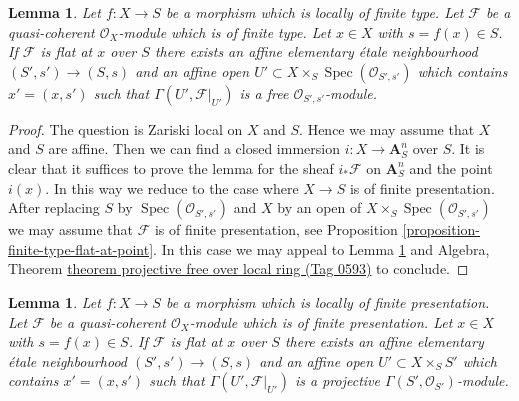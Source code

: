 \documentclass{amsart}
\theoremstyle{plain}
\newtheorem{lemma}[subsection]{Lemma}
\theoremstyle{definition}
\theoremstyle{remark}
\numberwithin{equation}{subsection}
\def\Spec{\mathop{\mathrm{Spec}}}
\begin{document}
\begin{lemma}
\label{lemma-flat-finite-type-affine-neighbourhood-projective}
Let $f : X \to S$ be a morphism which is locally of finite type.
Let $\mathcal{F}$ be a quasi-coherent $\mathcal{O}_X$-module which is
of finite type. Let $x \in X$ with $s = f(x) \in S$.
If $\mathcal{F}$ is flat at $x$ over $S$ there exists an affine
elementary \'etale neighbourhood $(S', s') \to (S, s)$ and
an affine open $U' \subset X \times_S \Spec(\mathcal{O}_{S', s'})$
which contains $x' = (x, s')$ such that
$\Gamma(U', \mathcal{F}|_{U'})$ is a free
$\mathcal{O}_{S', s'}$-module.
\end{lemma}

\begin{proof}
The question is Zariski local on $X$ and $S$. Hence we may assume
that $X$ and $S$ are affine. Then we can find a closed immersion
$i : X \to \mathbf{A}^n_S$ over $S$. It is clear that it suffices to
prove the lemma for the sheaf $i_*\mathcal{F}$ on $\mathbf{A}^n_S$
and the point $i(x)$. In this way we reduce to the case where $X \to S$ is
of finite presentation. After replacing $S$ by
$\Spec(\mathcal{O}_{S', s'})$ and $X$ by an open of
$X \times_S \Spec(\mathcal{O}_{S', s'})$ we may assume that
$\mathcal{F}$ is of finite presentation, see
Proposition \ref{proposition-finite-type-flat-at-point}.
In this case we may appeal to
Lemma \ref{lemma-flat-finite-presentation-affine-neighbourhood-projective}
and
Algebra, Theorem \href{https://stacks.math.columbia.edu/tag/0593}{theorem projective free over local ring (Tag 0593)}
to conclude.
\end{proof}


\begin{lemma}
\label{lemma-flat-finite-presentation-affine-neighbourhood-projective}
Let $f : X \to S$ be a morphism which is locally of finite presentation.
Let $\mathcal{F}$ be a quasi-coherent $\mathcal{O}_X$-module which is
of finite presentation. Let $x \in X$ with $s = f(x) \in S$.
If $\mathcal{F}$ is flat at $x$ over $S$ there exists an affine
elementary \'etale neighbourhood $(S', s') \to (S, s)$ and
an affine open $U' \subset X \times_S S'$ which contains $x' = (x, s')$
such that $\Gamma(U', \mathcal{F}|_{U'})$ is a projective
$\Gamma(S', \mathcal{O}_{S'})$-module.
\end{lemma}
\end{document}
